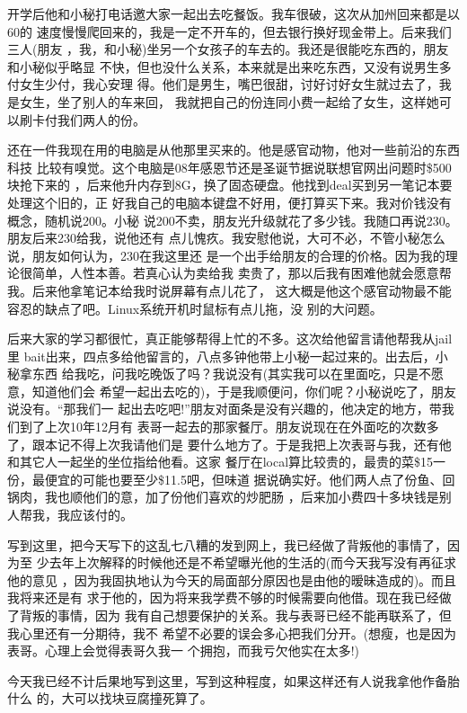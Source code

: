\documentclass[12pt]{book}
\begin{document}
开学后他和小秘打电话邀大家一起出去吃餐饭。我车很破，这次从加州回来都是以60的
速度慢慢爬回来的，我是一定不开车的，但去银行换好现金带上。后来我们三人(朋友
，我，和小秘)坐另一个女孩子的车去的。我还是很能吃东西的，朋友和小秘似乎略显
不快，但也没什么关系，本来就是出来吃东西，又没有说男生多付女生少付，我心安理
得。他们是男生，嘴巴很甜，讨好讨好女生就过去了，我是女生，坐了别人的车来回，
我就把自己的份连同小费一起给了女生，这样她可以刷卡付我们两人的份。

还在一件我现在用的电脑是从他那里买来的。他是感官动物，他对一些前沿的东西科技
比较有嗅觉。这个电脑是08年感恩节还是圣诞节据说联想官网出问题时\$500块抢下来的
，后来他升内存到8G，换了固态硬盘。他找到deal买到另一笔记本要处理这个旧的，正
好我自己的电脑本键盘不好用，便打算买下来。我对价钱没有概念，随机说200。小秘
说200不卖，朋友光升级就花了多少钱。我随口再说230。朋友后来230给我，说他还有
点儿愧疚。我安慰他说，大可不必，不管小秘怎么说，朋友如何认为，230在我这里还
是一个出手给朋友的合理的价格。因为我的理论很简单，人性本善。若真心认为卖给我
卖贵了，那以后我有困难他就会愿意帮我。后来他拿笔记本给我时说屏幕有点儿花了，
这大概是他这个感官动物最不能容忍的缺点了吧。Linux系统开机时鼠标有点儿拖，没
别的大问题。

后来大家的学习都很忙，真正能够帮得上忙的不多。这次给他留言请他帮我从jail里
bait出来，四点多给他留言的，八点多钟他带上小秘一起过来的。出去后，小秘拿东西
给我吃，问我吃晚饭了吗？我说没有(其实我可以在里面吃，只是不愿意，知道他们会
希望一起出去吃的)，于是我顺便问，你们呢？小秘说吃了，朋友说没有。“那我们一
起出去吃吧!”朋友对面条是没有兴趣的，他决定的地方，带我们到了上次10年12月有
表哥一起去的那家餐厅。朋友说现在在外面吃的次数多了，跟本记不得上次我请他们是
要什么地方了。于是我把上次表哥与我，还有他和其它人一起坐的坐位指给他看。这家
餐厅在local算比较贵的，最贵的菜\$15一份，最便宜的可能也要至少\$11.5吧，但味道
据说确实好。他们两人点了份鱼、回锅肉，我也顺他们的意，加了份他们喜欢的炒肥肠
，后来加小费四十多块钱是别人帮我，我应该付的。

写到这里，把今天写下的这乱七八糟的发到网上，我已经做了背叛他的事情了，因为至
少去年上次解释的时候他还是不希望曝光他的生活的(而今天我写没有再征求他的意见
，因为我固执地认为今天的局面部分原因也是由他的暧昧造成的)。而且我将来还是有
求于他的，因为将来我学费不够的时候需要向他借。现在我已经做了背叛的事情，因为
我有自己想要保护的关系。我与表哥已经不能再联系了，但我心里还有一分期待，我不
希望不必要的误会多心把我们分开。(想瘦，也是因为表哥。心理上会觉得表哥久我一
个拥抱，而我亏欠他实在太多!)

今天我已经不计后果地写到这里，写到这种程度，如果这样还有人说我拿他作备胎什么
的，大可以找块豆腐撞死算了。
\end{document}
